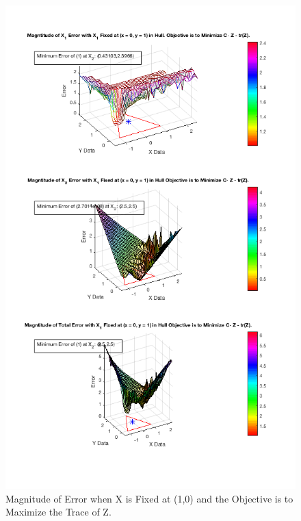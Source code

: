 \documentclass[answers]{exam}
\begin{document}
        \begin{figure}[H]
    \centering
    
        \caption{Magnitude of Error when X is Fixed at (1,0) and the Objective is to Maximize the Trace of Z.}
    \includegraphics[scale=.7]{Problem8f3.png}
    \end{figure} 
    
\end{document}
